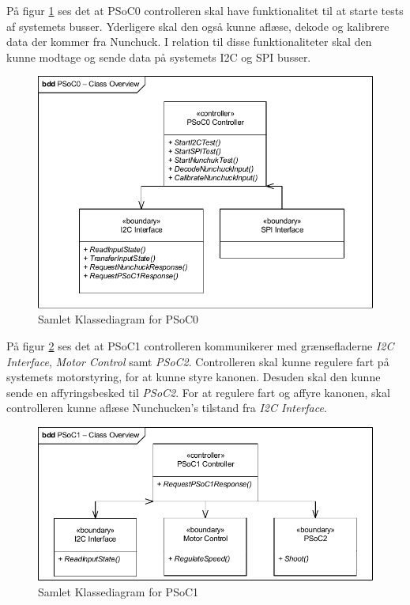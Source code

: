 \noindent På figur \ref{fig:CompleteClassDiagramPSoC0} ses det at PSoC0 controlleren skal have funktionalitet til at starte tests af systemets busser. Yderligere skal den også kunne aflæse, dekode og kalibrere data der kommer fra Nunchuck. I relation til disse funktionaliteter skal den kunne modtage og sende data på systemets I2C og SPI busser.
\begin{figure}[H]
	\centering
	\includegraphics[width=\textwidth] {Systemarkitektur/images/CompleteClassDiagramPSoC0}
	\caption{Samlet Klassediagram for PSoC0}
	\label{fig:CompleteClassDiagramPSoC0}
\end{figure}

\noindent På figur \ref{fig:CompleteClassDiagramPSoC1} ses det at PSoC1 controlleren kommunikerer med grænsefladerne \textit{I2C Interface}, \textit{Motor Control} samt \textit{PSoC2}. Controlleren skal kunne regulere fart på systemets motorstyring, for at kunne styre kanonen. Desuden skal den kunne sende en affyringsbesked til \textit{PSoC2}. For at regulere fart og affyre kanonen, skal controlleren kunne aflæse Nunchucken's tilstand fra \textit{I2C Interface}.
\begin{figure}[H]
	\centering
	\includegraphics[width=\textwidth] {Systemarkitektur/images/CompleteClassDiagramPSoC1}
	\caption{Samlet Klassediagram for PSoC1}
	\label{fig:CompleteClassDiagramPSoC1}
\end{figure}

